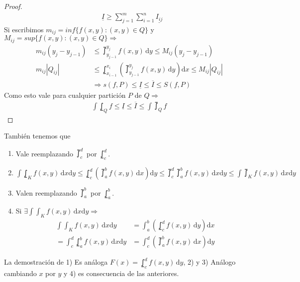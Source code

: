 \begin{theorem}
\begin{proof}
\begin{align*}
                                                              & \underline{I} \geq \sum_{j = 1}^m \sum_{i = 1}^n \underline{I_{ij}}
    \end{align*}
    Si escribimos \(m_{ij} = inf\{ f(x, y) : (x, y) \in Q \}\) y \(M_{ij} = sup\{ f(x, y) : (x, y) \in Q\} \Rightarrow\) \begin{align*}
      m_{ij} (y_j - y_{j-1}) & \leq \upint_{y_{j-1}}^{y_j} f(x, y)\, \mathrm{d} y \leq M_{ij} (y_j - y_{j-1})                                \\
      m_{ij} |Q_{ij}|        & \leq \lowint_{x_{i-1}}^{x_i} ( \upint_{y_{j-1}}^{y_j} f(x, y)\, \mathrm{d}y )\mathrm{d}x \leq M_{ij} |Q_{ij}| \\
                             & \Rightarrow s(f, P) \leq \underline{I} \leq \overline{I} \leq S(f, P)
    \end{align*}
    Como esto vale para cualquier partición \(P\) de \(Q \Rightarrow\) \begin{align*}
      \int\lowint_Q f \leq \underline{I} \leq \overline{I} \leq \int\upint_Q f
    \end{align*}
  \end{proof}
\end{theorem}

\clearpage

\begin{note}
  También tenemos que

  \begin{enumerate}
    \item Vale reemplazando \(\upint_c^d\) por \(\lowint_c^d\).
    \item \(\int \lowint_K f(x, y) \, \mathrm{d}x \mathrm{d}y \leq \lowint_c^d ( \upint_a^b f(x, y)\, \mathrm{d}x ) \mathrm{d}y \leq \upint_c^d \upint_a^b f(x, y) \, \mathrm{d}x \mathrm{d}y \leq \int \upint_K f(x, y) \, \mathrm{d}x \mathrm{d}y\)
    \item Valen reemplazando \(\upint_a^b\) por \(\lowint_a^b\).
    \item Si \(\exists \int \int_K f(x, y) \, \mathrm{d}x \mathrm{d}y \Rightarrow\) \begin{align*}
            \int \int_K f(x, y) \, \mathrm{d}x \mathrm{d}y & = \int_a^b(\lowint_c^d f(x, y) \, \mathrm{d}y)\mathrm{d}x \\ 
             = \int_c^d \lowint_a^b f(x, y) \, \mathrm{d}x \mathrm{d}y & = \int_c^d(\upint_a^b f(x,y) \, \mathrm{d}x)\mathrm{d}y
    \end{align*}
  \end{enumerate}

  La demostración de 1) Es análoga \(F(x) = \lowint_c^d f(x, y) \, \mathrm{d}y\), 2) y 3) Análogo cambiando \(x\) por \(y\) y 4) es consecuencia de las anteriores.
\end{note}

